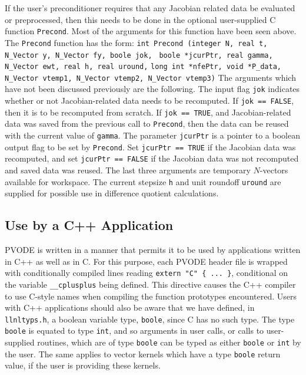 If the user's preconditioner requires that any Jacobian related data
be evaluated or preprocessed, then this needs to be done in the
optional user-supplied C function {\tt Precond}. Most of the arguments
for this function have been seen above. The {\tt Precond} function has
the form:
\newline \hspace*{.4 in} {\tt int Precond (integer N, real t, N\_Vector y,
N\_Vector fy, boole jok, }
\newline \hspace*{1.0 in} {\tt boole *jcurPtr, real gamma, N\_Vector ewt, 
real h, real uround,}
\newline \hspace*{1.0 in} {\tt long int *nfePtr, void *P\_data,} 
\newline \hspace*{1.0 in} {\tt N\_Vector vtemp1, N\_Vector vtemp2,
 N\_Vector vtemp3)}
\newline The arguments which have not been discussed previously are the
following. The input flag {\tt jok} indicates whether or not
Jacobian-related data needs to be recomputed. If {\tt jok == FALSE}, then it
is to be recomputed from scratch. If {\tt jok == TRUE}, and Jacobian-related
data was saved from the previous call to {\tt Precond}, then the data can be
reused with the current value of {\tt gamma}. The parameter {\tt jcurPtr} is
a pointer to a boolean output flag to be set by {\tt Precond}. Set 
{\tt *jcurPtr == TRUE} if the Jacobian data was recomputed, and set
{\tt *jcurPtr == FALSE} if the Jacobian data was not recomputed and
saved data was reused.  The last three arguments are temporary
$N$-vectors available for workspace.  The current stepsize {\tt h} and
unit roundoff {\tt uround} are supplied for possible use in difference
quotient calculations.

\subsection{Use by a C++ Application}

PVODE is written in a manner that permits it to be used by
applications written in C++ as well as in C.  For this purpose, each
PVODE header file is wrapped with conditionally compiled lines reading
{\tt extern "C" \{ ... \}}, conditional on the variable 
{\tt \_\_cplusplus} being defined.  This directive causes the C++
compiler to use C-style names when compiling the function prototypes
encountered.  Users with C++ applications should also be aware that we
have defined, in {\tt llnltyps.h}, a boolean variable type, 
{\tt boole}, since C has no such type.  The type {\tt boole} is
equated to type {\tt int}, and so arguments in user calls, or calls to
user-supplied routines, which are of type {\tt boole} can be typed as
either {\tt boole} or {\tt int} by the user.  The same applies to
vector kernels which have a type {\tt boole} return value, if the user
is providing these kernels.


